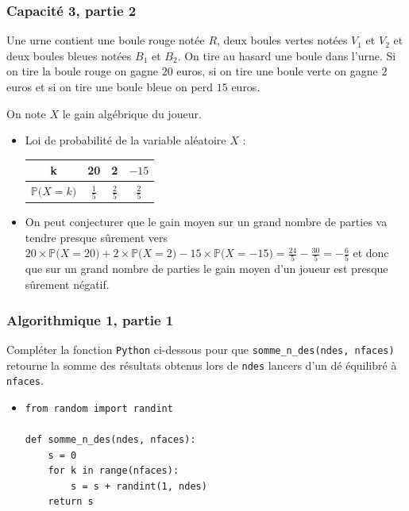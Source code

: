 \documentclass[11pt, hyperref={urlcolor=red,%
            linkcolor=blue, %
            colorlinks=true}]{beamer}
\newcommand{\proba}[1]{\mathbb{P}\big(#1\big)}
\begin{document}
\begin{frame}
\frametitle{Capacité 3,  partie 2}


Une urne contient une boule rouge notée $R$, deux boules vertes notées $V_{1}$ et $V_{2}$ et deux boules bleues notées $B_{1}$ et $B_{2}$. On tire au hasard une boule dans l'urne. Si on tire la boule rouge on gagne $20$ euros, si on tire une boule verte on gagne $2$ euros et si on tire une boule bleue on perd $15$ euros.

On note $X$ le gain algébrique du joueur.

\begin{itemize}
	\pause \item Loi de probabilité de la variable aléatoire $X$ :
	
\begin{center}
\begin{tabular}{|c|c|c|c|}
\hline 
k & 20 & 2 & $-15$ \\ 
\hline 
$\proba{X=k}$ & $\frac{1}{5}$ & $\frac{2}{5}$ & $\frac{2}{5}$ \\ 
\hline 
\end{tabular} 
\end{center}

	
	\pause \item On peut conjecturer que le gain moyen sur un grand nombre de parties va tendre presque sûrement vers $20 \times \proba{X=20} + 2 \times \proba{X=2}-15\times \proba{X=-15}=\frac{24}{5}-\frac{30}{5}=-\frac{6}{5}$ et donc que sur un grand nombre de parties le gain moyen d'un joueur est presque sûrement négatif.
	
\end{itemize}
	

\end{frame}



\begin{frame}[fragile]
\label{algo1}
\frametitle{Algorithmique 1,  partie 1}

 Compléter la fonction \texttt{Python} ci-dessous pour que \texttt{somme\_n\_des(ndes, nfaces)} retourne la somme des résultats obtenus lors de \texttt{ndes} lancers d'un dé équilibré à \texttt{nfaces}.
 
\begin{itemize}

\pause \item 


\begin{lstlisting}[style=rond]
from random import randint

def somme_n_des(ndes, nfaces):
    s = 0
    for k in range(nfaces):
        s = s + randint(1, ndes)
    return s
\end{lstlisting}

\end{itemize}


\end{frame}
\end{document}
